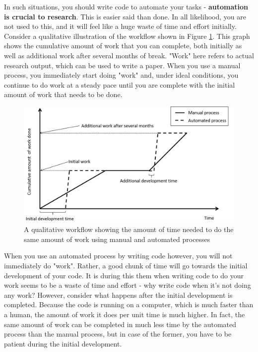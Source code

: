 \documentclass[12pt]{article}
\begin{document}
In such situations, you should write code to automate your tasks - \textbf{automation is crucial to research}. This is easier said than done. In all likelihood, you are not used to this, and it will feel like a huge waste of time and effort initially. Consider a qualitative illustration of the workflow shown in Figure \ref{fig:auto-workflow}. This graph shows the cumulative amount of work that you can complete, both initially as well as additional work after several months of break. "Work" here refers to actual research output, which can be used to write a paper. When you use a manual process, you immediately start doing "work" and, under ideal conditions, you continue to do work at a steady pace until you are complete with the initial amount of work that needs to be done. 

\begin{figure}[htbp]
	\centering
	\includegraphics[scale=0.5]{auto-workflow.jpg}
	\caption{A qualitative workflow showing the amount of time needed to do the same amount of work using manual and automated processes}
	\label{fig:auto-workflow}
\end{figure}

When you use an automated process by writing code however, you will not immediately do "work". Rather, a good chunk of time will go towards the initial development of your code. It is during this them when writing code to do your work seems to be a waste of time and effort - why write code when it's not doing any work? However, consider what happens after the initial development is completed. Because the code is running on a computer, which is much faster than a human, the amount of work it does per unit time is much higher. In fact, the same amount of work can be completed in much less time by the automated process than the manual process, but in case of the former, you have to be patient during the initial development. 
\end{document}

